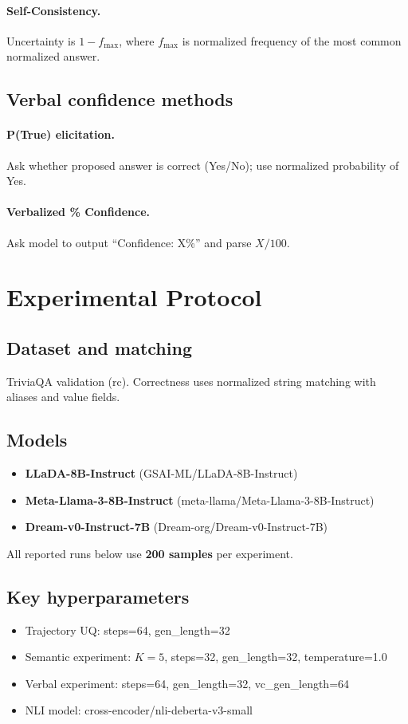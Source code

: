 \documentclass{article}
\begin{document}
\paragraph{Self-Consistency.}
Uncertainty is $1 - f_{\max}$, where $f_{\max}$ is normalized frequency of the most common normalized answer.

\subsection{Verbal confidence methods}
\paragraph{P(True) elicitation.}
Ask whether proposed answer is correct (Yes/No); use normalized probability of Yes.

\paragraph{Verbalized \% Confidence.}
Ask model to output ``Confidence: X\%'' and parse $X/100$.

\section{Experimental Protocol}
\subsection{Dataset and matching}
TriviaQA validation (rc). Correctness uses normalized string matching with aliases and value fields.

\subsection{Models}
\begin{itemize}
\item \textbf{LLaDA-8B-Instruct} (GSAI-ML/LLaDA-8B-Instruct)
\item \textbf{Meta-Llama-3-8B-Instruct} (meta-llama/Meta-Llama-3-8B-Instruct)
\item \textbf{Dream-v0-Instruct-7B} (Dream-org/Dream-v0-Instruct-7B)
\end{itemize}
All reported runs below use \textbf{200 samples} per experiment.

\subsection{Key hyperparameters}
\begin{itemize}
\item Trajectory UQ: steps=64, gen\_length=32
\item Semantic experiment: $K=5$, steps=32, gen\_length=32, temperature=1.0
\item Verbal experiment: steps=64, gen\_length=32, vc\_gen\_length=64
\item NLI model: cross-encoder/nli-deberta-v3-small
\end{itemize}
\end{document}
